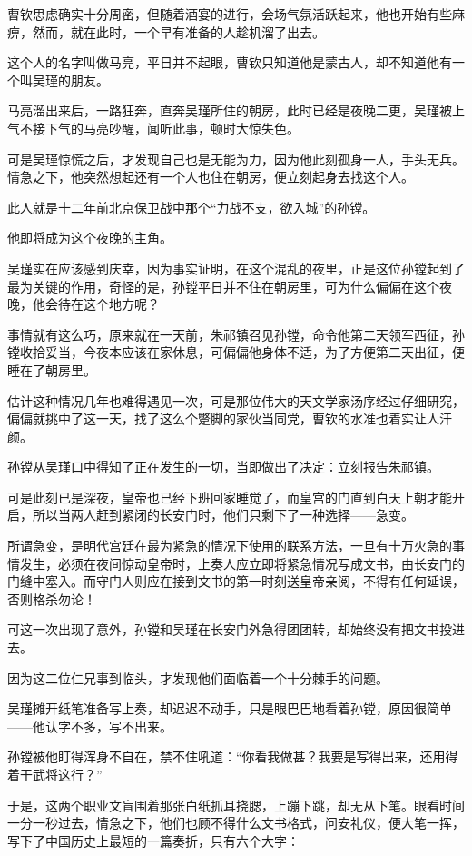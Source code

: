\begin{multicols}{\theparacolNo}
		曹钦思虑确实十分周密，但随着酒宴的进行，会场气氛活跃起来，他也开始有些麻痹，然而，就在此时，一个早有准备的人趁机溜了出去。

		这个人的名字叫做马亮，平日并不起眼，曹钦只知道他是蒙古人，却不知道他有一个叫吴瑾的朋友。

		马亮溜出来后，一路狂奔，直奔吴瑾所住的朝房，此时已经是夜晚二更，吴瑾被上气不接下气的马亮吵醒，闻听此事，顿时大惊失色。

		可是吴瑾惊慌之后，才发现自己也是无能为力，因为他此刻孤身一人，手头无兵。情急之下，他突然想起还有一个人也住在朝房，便立刻起身去找这个人。

		此人就是十二年前北京保卫战中那个“力战不支，欲入城”的孙镗。

		他即将成为这个夜晚的主角。

		吴瑾实在应该感到庆幸，因为事实证明，在这个混乱的夜里，正是这位孙镗起到了最为关键的作用，奇怪的是，孙镗平日并不住在朝房里，可为什么偏偏在这个夜晚，他会待在这个地方呢？

		事情就有这么巧，原来就在一天前，朱祁镇召见孙镗，命令他第二天领军西征，孙镗收拾妥当，今夜本应该在家休息，可偏偏他身体不适，为了方便第二天出征，便睡在了朝房里。

		估计这种情况几年也难得遇见一次，可是那位伟大的天文学家汤序经过仔细研究，偏偏就挑中了这一天，找了这么个蹩脚的家伙当同党，曹钦的水准也着实让人汗颜。

		孙镗从吴瑾口中得知了正在发生的一切，当即做出了决定：立刻报告朱祁镇。

		可是此刻已是深夜，皇帝也已经下班回家睡觉了，而皇宫的门直到白天上朝才能开启，所以当两人赶到紧闭的长安门时，他们只剩下了一种选择——急变。

		所谓急变，是明代宫廷在最为紧急的情况下使用的联系方法，一旦有十万火急的事情发生，必须在夜间惊动皇帝时，上奏人应立即将紧急情况写成文书，由长安门的门缝中塞入。而守门人则应在接到文书的第一时刻送皇帝亲阅，不得有任何延误，否则格杀勿论！

		可这一次出现了意外，孙镗和吴瑾在长安门外急得团团转，却始终没有把文书投进去。

		因为这二位仁兄事到临头，才发现他们面临着一个十分棘手的问题。

		吴瑾摊开纸笔准备写上奏，却迟迟不动手，只是眼巴巴地看着孙镗，原因很简单——他认字不多，写不出来。

		孙镗被他盯得浑身不自在，禁不住吼道：“你看我做甚？我要是写得出来，还用得着干武将这行？”

		于是，这两个职业文盲围着那张白纸抓耳挠腮，上蹦下跳，却无从下笔。眼看时间一分一秒过去，情急之下，他们也顾不得什么文书格式，问安礼仪，便大笔一挥，写下了中国历史上最短的一篇奏折，只有六个大字：


\end{multicols}
